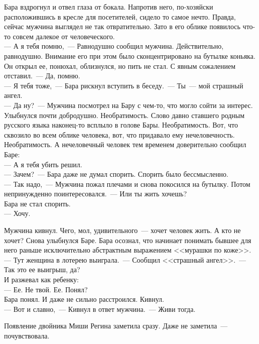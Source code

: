 Бара вздрогнул и отвел глаза от бокала. Напротив него, по-хозяйски 
расположившись в кресле для посетителей, сидело то самое нечто. Правда, сейчас 
мужчина выглядел не так отвратительно. Зато в его облике появилось что-то 
совсем далекое от человеческого.\\
--- А я тебя помню,~--- Равнодушно сообщил мужчина. Действительно, равнодушно. 
Внимание его при этом было сконцентрировано на бутылке коньяка. Он открыл ее, 
понюхал, облизнулся, но пить не стал. С явным сожалением отставил.~--- Да, 
помню.\\
--- Я тебя тоже,~--- Бара рискнул вступить в беседу.~--- Ты~--- мой страшный 
ангел.\\
--- Да ну?~--- Мужчина посмотрел на Бару с чем-то, что могло сойти за интерес. 
Улыбнулся почти добродушно. Необратимость. Слово давно ставшего родным русского 
языка наконец-то всплыло в голове Бары. Необратимость. Вот, что сквозило во 
всем облике человека, вот, что придавало ему нечеловечность. Необратимость. А 
нечеловечный человек тем временем доверительно сообщил Баре:\\
--- А я тебя убить решил.\\
--- Зачем?~--- Бара даже не думал спорить. Спорить было бессмысленно.\\
--- Так надо,~--- Мужчина пожал плечами и снова покосился на бутылку. Потом 
непринужденно поинтересовался.~--- Или ты жить хочешь?\\
Бара не стал спорить.\\
--- Хочу.

Мужчина кивнул. Чего, мол, удивительного~--- хочет человек жить. А кто не 
хочет? Снова улыбнулся Баре. Бара осознал, что начинает понимать бывшее для него 
раньше исключительно абстрактным выражением <<мурашки по коже>>.\\
--- Тут женщина в лотерею выиграла.~--- Сообщил <<страшный ангел>>.~--- Так это 
ее выигрыш, да?\\
И разжевал как ребенку:\\
--- Ее. Не твой. Ее. Понял?\\
Бара понял. И даже не сильно расстроился. Кивнул.\\
--- Вот и славно,~--- Кивнул в ответ мужчина.~--- Живи тогда.

\newpage

Появление двойника Миши Регина заметила сразу. Даже не заметила~--- 
почувствовала. 

